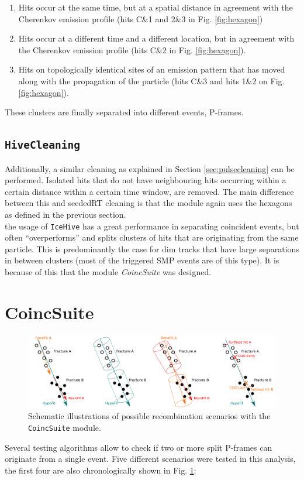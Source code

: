 \begin{enumerate}
\item Hits occur at the same time, but at a spatial distance in agreement with the Cherenkov emission profile (hits C\&1 and 2\&3 in Fig. \ref{fig:hexagon})
\item Hits occur at a different time and a different location, but in agreement with the Cherenkov emission profile (hits C\&2 in Fig. \ref{fig:hexagon}).
\item Hits on topologically identical sites of an emission pattern that has moved along with the propagation of the particle (hits C\&3 and hits 1\&2 on Fig. \ref{fig:hexagon}).
\end{enumerate}
These clusters are finally separated into different events, P-frames.

\subsection{\texttt{HiveCleaning}}
Additionally, a similar cleaning as explained in Section \ref{sec:pulsecleaning} can be performed. Isolated hits that do not have neighbouring hits occurring within a certain distance within a certain time window, are removed. The main difference between this and seededRT cleaning is that the module again uses the hexagons as defined in the previous section.\\

\noindent the usage of \texttt{IceHive} has a great performance in separating coincident events, but often ``overperforms'' and splits clusters of hits that are originating from the same particle. This is predominantly the case for dim tracks that have large separations in between clusters (most of the triggered SMP events are of this type). It is because of this that the module \textit{CoincSuite}  was designed.

\section{CoincSuite}
\begin{figure}[t]
\centering
\includegraphics[width=\textwidth]{chapter7/img/coincsuite.png}
\caption{Schematic illustrations of possible recombination scenarios with the \texttt{CoincSuite} module.}
\label{fig:coincsuite}
\end{figure}
Several testing algorithms allow to check if two or more split P-frames can originate from a single event. Five different scenarios were tested in this analysis, the first four are also chronologically shown in Fig. \ref{fig:coincsuite}:
\vspace{2mm}

